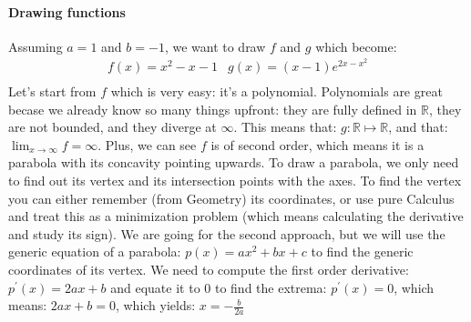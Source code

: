 \paragraph[Problem 3]{Drawing functions}
\label{par:subp3_1}
Assuming $a = 1$ and $b = -1$, we want to draw $f$ and $g$ which become:
\begin{equation*}
    \begin{array}{cc}
        f(x) = x^2 - x -1 & g(x) = (x - 1)e^{2x - x^2} \\
    \end{array}
\end{equation*}
Let's start from $f$ which is very easy: it's a polynomial. Polynomials
are great becase we already know so many things upfront: they are
fully defined in $\mathbb{R}$, they are not
bounded,
and they diverge at $\infty$. This means
that: $g : \mathbb{R} \mapsto \mathbb{R}$, and that:
$\lim_{x \to \infty} f = \infty$. Plus, we can see $f$ is of second order,
which means it is a parabola with its concavity pointing
upwards. To draw a parabola, we only need
to find out its vertex and its intersection points with the axes.
To find the vertex you can either remember (from Geometry) its coordinates,
or use pure Calculus and treat this as a
minimization problem (which means calculating the derivative
and study its sign). We are going for the second approach, but we will use
the generic equation of a parabola: $p(x) = ax^2 + bx + c$ to
find the generic coordinates of its vertex. We need to compute the first
order derivative: $p^\prime(x) = 2ax + b$ and equate it to $0$ to find
the extrema: $p^\prime(x) = 0$, which means: $2ax + b = 0$, which yields:
$x = -\frac{b}{2a}$
